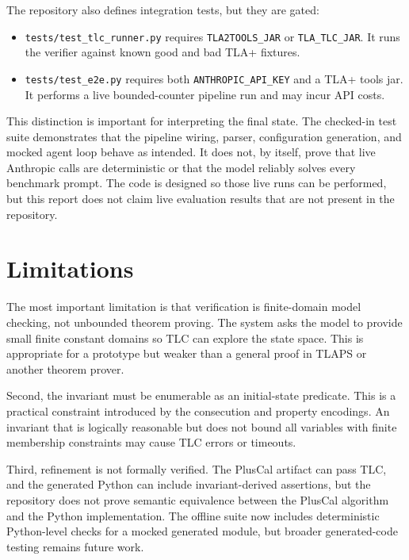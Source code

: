 \documentclass[11pt]{article}
\begin{document}
The repository also defines integration tests, but they are gated:

\begin{itemize}[leftmargin=*]
  \item \texttt{tests/test\_tlc\_runner.py} requires \texttt{TLA2TOOLS\_JAR}
  or \texttt{TLA\_TLC\_JAR}. It runs the verifier against known good and bad
  TLA+ fixtures.
  \item \texttt{tests/test\_e2e.py} requires both \texttt{ANTHROPIC\_API\_KEY}
  and a TLA+ tools jar. It performs a live bounded-counter pipeline run and
  may incur API costs.
\end{itemize}

This distinction is important for interpreting the final state. The checked-in
test suite demonstrates that the pipeline wiring, parser, configuration
generation, and mocked agent loop behave as intended. It does not, by itself,
prove that live Anthropic calls are deterministic or that the model reliably
solves every benchmark prompt. The code is designed so those live runs can be
performed, but this report does not claim live evaluation results that are not
present in the repository.

\section{Limitations}

The most important limitation is that verification is finite-domain model
checking, not unbounded theorem proving. The system asks the model to provide
small finite constant domains so TLC can explore the state space. This is
appropriate for a prototype but weaker than a general proof in TLAPS or another
theorem prover.

Second, the invariant must be enumerable as an initial-state predicate. This
is a practical constraint introduced by the consecution and property encodings.
An invariant that is logically reasonable but does not bound all variables
with finite membership constraints may cause TLC errors or timeouts.

Third, refinement is not formally verified. The PlusCal artifact can pass TLC,
and the generated Python can include invariant-derived assertions, but the
repository does not prove semantic equivalence between the PlusCal algorithm
and the Python implementation. The offline suite now includes deterministic
Python-level checks for a mocked generated module, but broader generated-code
testing remains future work.
\end{document}
